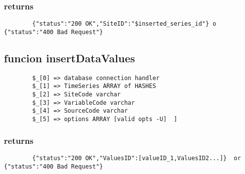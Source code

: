 \documentclass{article}
\begin{document}
\subsubsection*{returns\label{returns}}
\begin{verbatim}
        {"status":"200 OK","SiteID":"$inserted_series_id"} o {"status":"400 Bad Request"}
\end{verbatim}
\subsection*{funcion insertDataValues\label{funcion_insertDataValues}}
\begin{verbatim}
        $_[0] => database connection handler
        $_[1] => TimeSeries ARRAY of HASHES
        $_[2] => SiteCode varchar
        $_[3] => VariableCode varchar
        $_[4] => SourceCode varchar
        $_[5] => options ARRAY [valid opts -U]  ]
\end{verbatim}
\subsubsection*{returns\label{returns}}
\begin{verbatim}
        {"status":"200 OK","ValuesID":[valueID_1,ValuesID2...]}  or {"status":"400 Bad Request"}
\end{verbatim}
\printindex
\end{document}
